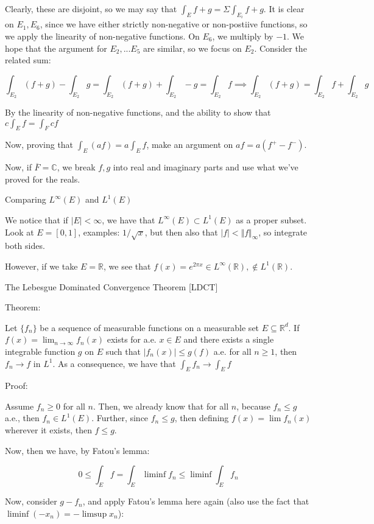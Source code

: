 \documentclass[10pt]{article}
\begin{document}
Clearly, these are disjoint, so we may say that $\int_E f + g = \Sigma \int_{E_i} f + g$. It is clear on $E_1, E_6$, since we have either strictly non-negative or non-postiive functions, so we apply the linearity of non-negative functions. On $E_6$, we multiply by $-1$. We hope that the argument for $E_2,...E_5$ are similar, so we focus on $E_2$. Consider the related sum:

$$ \int_{E_2} (f + g) - \int_{E_2} g  =  \int_{E_2} (f + g) + \int_{E_2} -g  = \int_{E_2} f \implies \int_{E_2} (f + g)  = \int_{E_2} f  + \int_{E_2} g $$

By the linearity of non-negative functions, and the ability to show that $c \int_E f = \int_F cf$

Now, proving that $\int_E (af) = a \int_E f$, make an argument on $af = a(f^+ - f^-)$.

Now, if $\overline{F} = \mathbb{C}$, we break $f,g$ into real and imaginary parts and use what we’ve proved for the reals.

Comparing $L^\infty(E)$ and $L^1(E)$

We notice that if $|E| < \infty$, we have that $L^\infty(E) \subset L^1(E)$ as a proper subset. Look at $E = [0,1]$, examples: $1/\sqrt{x}$, but then also that $|f| < \Vert f \Vert_\infty$, so integrate both sides.

However, if we take $E = \mathbb{R}$, we see that $f(x) = e^{2\pi x} \in L^\infty(\mathbb{R}), \not \in L^1(\mathbb{R})$.

The Lebesgue Dominated Convergence Theorem [LDCT]

Theorem:

Let $\{ f_n \}$ be a sequence of measurable functions on a measurable set $ E \subseteq \mathbb{R}^d$. If $f(x) = \lim_{n \to \infty} f_n(x)$ exists for a.e. $x \in E$ and there exists a single integrable function $g$ on $E$ such that $|f_n(x)| \leq g(f)$ a.e. for all $n \geq 1$, then $f_n \to f$ in $L^1$. As a consequence, we have that $\int_E f_n \to \int_E f$

Proof:

Assume $f_n \geq 0$ for all $n$. Then, we already know that for all $n$, because $f_n \leq g$ a.e., then $f_n \in L^1(E)$. Further, since $f_n \leq g$, then defining $f(x) = \lim f_n(x)$ wherever it exists, then $f \leq g$.

Now, then we have, by Fatou’s lemma:

$$ 0 \leq \int_E f = \int_E \liminf f_n \leq \liminf \int_E f_n$$

Now, consider $g - f_n$, and apply Fatou’s lemma here again (also use the fact that $\liminf (-x_n) = - \limsup x_n$):
\end{document}
